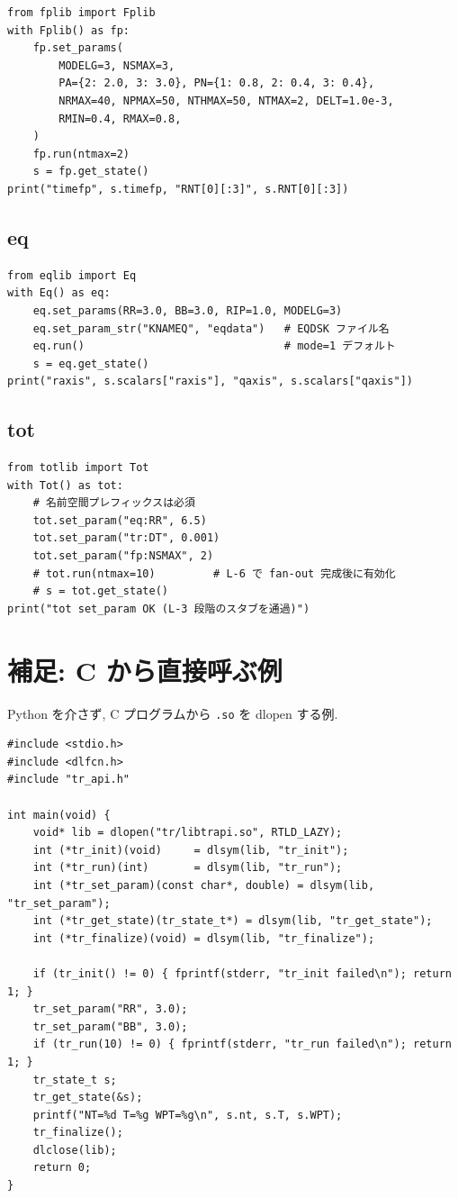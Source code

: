 \documentclass[11pt,a4paper]{report}
\begin{document}
\begin{lstlisting}[style=py]
from fplib import Fplib
with Fplib() as fp:
    fp.set_params(
        MODELG=3, NSMAX=3,
        PA={2: 2.0, 3: 3.0}, PN={1: 0.8, 2: 0.4, 3: 0.4},
        NRMAX=40, NPMAX=50, NTHMAX=50, NTMAX=2, DELT=1.0e-3,
        RMIN=0.4, RMAX=0.8,
    )
    fp.run(ntmax=2)
    s = fp.get_state()
print("timefp", s.timefp, "RNT[0][:3]", s.RNT[0][:3])
\end{lstlisting}

\section{eq}

\begin{lstlisting}[style=py]
from eqlib import Eq
with Eq() as eq:
    eq.set_params(RR=3.0, BB=3.0, RIP=1.0, MODELG=3)
    eq.set_param_str("KNAMEQ", "eqdata")   # EQDSK ファイル名
    eq.run()                               # mode=1 デフォルト
    s = eq.get_state()
print("raxis", s.scalars["raxis"], "qaxis", s.scalars["qaxis"])
\end{lstlisting}

\section{tot}

\begin{lstlisting}[style=py]
from totlib import Tot
with Tot() as tot:
    # 名前空間プレフィックスは必須
    tot.set_param("eq:RR", 6.5)
    tot.set_param("tr:DT", 0.001)
    tot.set_param("fp:NSMAX", 2)
    # tot.run(ntmax=10)         # L-6 で fan-out 完成後に有効化
    # s = tot.get_state()
print("tot set_param OK (L-3 段階のスタブを通過)")
\end{lstlisting}

\chapter{補足: C から直接呼ぶ例}

Python を介さず, C プログラムから \texttt{.so} を dlopen する例.

\begin{lstlisting}[style=c,caption={C ドライバの最短例 (tr 版)}]
#include <stdio.h>
#include <dlfcn.h>
#include "tr_api.h"

int main(void) {
    void* lib = dlopen("tr/libtrapi.so", RTLD_LAZY);
    int (*tr_init)(void)     = dlsym(lib, "tr_init");
    int (*tr_run)(int)       = dlsym(lib, "tr_run");
    int (*tr_set_param)(const char*, double) = dlsym(lib, "tr_set_param");
    int (*tr_get_state)(tr_state_t*) = dlsym(lib, "tr_get_state");
    int (*tr_finalize)(void) = dlsym(lib, "tr_finalize");

    if (tr_init() != 0) { fprintf(stderr, "tr_init failed\n"); return 1; }
    tr_set_param("RR", 3.0);
    tr_set_param("BB", 3.0);
    if (tr_run(10) != 0) { fprintf(stderr, "tr_run failed\n"); return 1; }
    tr_state_t s;
    tr_get_state(&s);
    printf("NT=%d T=%g WPT=%g\n", s.nt, s.T, s.WPT);
    tr_finalize();
    dlclose(lib);
    return 0;
}
\end{lstlisting}
\end{document}
